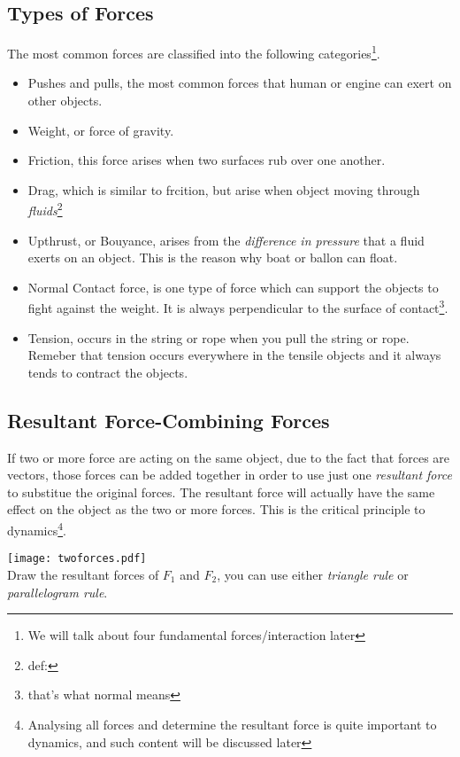 \documentclass[a4paper]{tufte-handout}
\newenvironment{TaskBox} %
{\begin{tcolorbox}[breakable,colback=b1!30,colframe=b1,title=Task]} {\end{tcolorbox}}
\begin{document}
\subsection{Types of Forces}
The most common forces are classified into the following categories\footnote{We will talk about four fundamental forces/interaction later}.
\begin{itemize}
  \item Pushes and pulls, the most common forces that human or engine can exert on other objects.
  \item Weight, or force of gravity.
  \item Friction, this force arises when two surfaces rub over one another.
  \item Drag, which is similar to frcition, but arise when object moving through \emph{fluids}\footnote{def:}
  \item Upthrust, or Bouyance, arises from the \emph{difference in pressure} that a fluid exerts on an object. This is the reason why boat or ballon can float.
  \item Normal Contact force, is one type of force which can support the objects to fight against the weight. It is always perpendicular to the surface of contact\footnote{that's what normal means}.
  \item Tension, occurs in the string or rope when you pull the string or rope. Remeber that tension occurs everywhere in the tensile objects and it always tends to contract the objects.
\end{itemize}

\subsection{Resultant Force-Combining Forces}
If two or more force are acting on the same object, due to the fact that forces are vectors, those forces can be added together in order to use just one \emph{resultant force} to substitue the original forces. The resultant force will actually have the same effect on the object as the two or more forces. This is the critical principle to dynamics\footnote{Analysing all forces and determine the resultant force is quite important to dynamics, and such content will be discussed later}.

\begin{TaskBox}
\texttt{[image: twoforces.pdf]}\\
Draw the resultant forces of $F_1$ and $F_2$, you can use either \emph{triangle rule} or \emph{parallelogram rule}.
\end{TaskBox}
\end{document}

